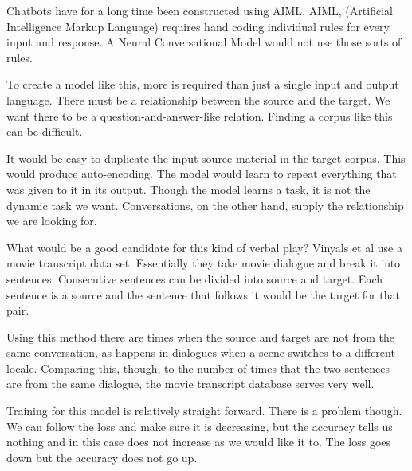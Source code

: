 Chatbots have for a long time been constructed using \ac{AIML}. AIML, (Artificial Intelligence Markup Language) requires hand coding individual rules for every input and response. A Neural Conversational Model would not use those sorts of rules.

To create a model like this, more is required than just a single input and output language. There must be a relationship between the source and the target. We want there to be a question-and-answer-like relation. Finding a corpus like this can be difficult.

It would be easy to duplicate the input source material in the target corpus. This would produce auto-encoding. The model would learn to repeat everything that was given to it in its output. Though the model learns a task, it is not the dynamic task we want. Conversations, on the other hand, supply the relationship we are looking for. 

What would be a good candidate for this kind of verbal play? Vinyals et al \cite{DBLP:journals/corr/VinyalsL15} use a movie transcript data set. Essentially they take movie dialogue and break it into sentences. Consecutive sentences can be divided into source and target. Each sentence is a source and the sentence that follows it would be the target for that pair. 

Using this method there are times when the source and target are not from the same conversation, as happens in dialogues when a scene switches to a different locale. Comparing this, though, to the number of times that the two sentences are from the same dialogue, the movie transcript database serves very well.

Training for this model is relatively straight forward. There is a problem though. We can follow the loss and make sure it is decreasing, but the accuracy tells us nothing and in this case does not increase as we would like it to. The loss goes down but the accuracy does not go up.

